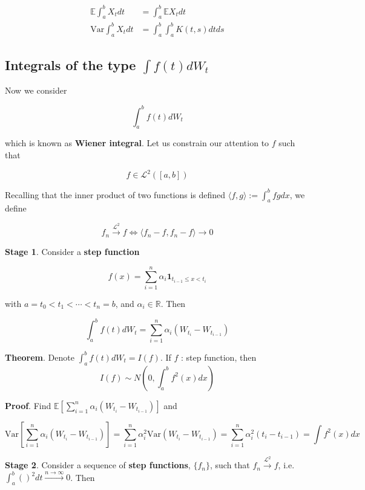 \documentclass[12pt]{article}
\theoremstyle{nonumberbreak}
\begin{document}
$$
\begin{aligned}
\mathbb{E} \int_a^b X_t dt &= \int_a^b \mathbb{E}X_t dt \\[8pt]
\mathrm{Var} \int_a^b X_t dt &= \int_a^b \int_a^b K(t,s) dt ds
\end{aligned}
$$


\subsection{Integrals of the type $\int f(t) d W_t$}

Now we consider

$$
\int_a^b f(t) dW_t
$$

which is known as \textbf{Wiener integral}. Let us constrain our attention to $f$ such that

$$
f \in \mathcal{L}^2 \left( [a,b] \right)
$$

Recalling that the inner product of two functions is defined $\langle f,g \rangle := \int_a^b fg dx$, we define

$$
f_n \overset{\mathcal{L}^2}{\to} f \Leftrightarrow \langle f_n -f, f_n-f\rangle \to 0
$$

\bigskip

\textbf{Stage 1}. Consider a \textbf{step function}

$$
f(x) = \sum_{i=1}^n \alpha_i \mathbf{1}_{t_{i-1} \le x < t_i}
$$

with $a = t_0 < t_1 < \cdots < t_n = b$, and $\alpha_i \in \mathbb{R}$. Then 

$$
\int_a^b f(t) dW_t = \sum_{i=1}^n \alpha_i \left( W_{t_i} - W_{t_{i-1}} \right)
$$


\begin{theorem}
\textbf{Theorem}. Denote $\int_a^b f(t) dW_t = I(f)$. If $f$ : step function, then
$$
I(f) \sim N \left(0, \int_a^b f^2(x) dx \right)
$$
\end{theorem}

\textbf{Proof}. Find $\mathbb{E} \left[ \sum_{i=1}^n \alpha_i \left( W_{t_i} - W_{t_{i-1}} \right) \right]$ and 

$$
\mathrm{Var} \left[ \sum_{i=1}^n \alpha_i \left( W_{t_i} - W_{t_{i-1}} \right) \right] = \sum_{i=1}^n \alpha_i^2 \mathrm{Var} \left( W_{t_i} - W_{t_{i-1}}\right) = \sum_{i=1}^n \alpha_i^2 (t_i - t_{i-1}) = \int f^2(x) dx
$$

\textbf{Stage 2}. Consider a sequence of \textbf{step functions}, $\{ f_n \}$, such that $f_n \overset{\mathcal{L}^2}{\to} f$, i.e. $\int_a^b \left( \right)^2 dt \overset{n\to\infty}{\to} 0$. Then
\end{document}
